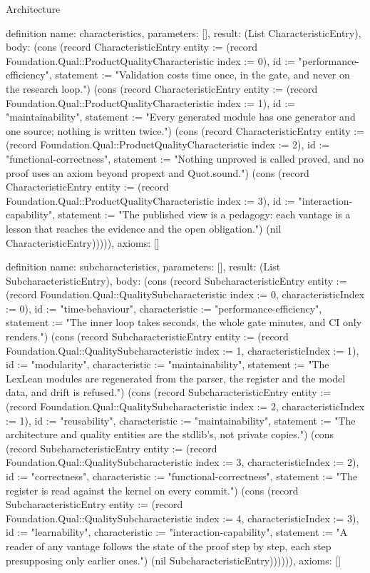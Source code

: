 \begin{lexlean}{Architecture}
\begin{semanticmodule}
definition{
  name: characteristics,
  parameters: [],
  result: (List CharacteristicEntry),
  body: (cons (record CharacteristicEntry {entity := (record Foundation.Qual::ProductQualityCharacteristic {index := 0}), id := "performance-efficiency", statement := "Validation costs time once, in the gate, and never on the research loop."}) (cons (record CharacteristicEntry {entity := (record Foundation.Qual::ProductQualityCharacteristic {index := 1}), id := "maintainability", statement := "Every generated module has one generator and one source; nothing is written twice."}) (cons (record CharacteristicEntry {entity := (record Foundation.Qual::ProductQualityCharacteristic {index := 2}), id := "functional-correctness", statement := "Nothing unproved is called proved, and no proof uses an axiom beyond propext and Quot.sound."}) (cons (record CharacteristicEntry {entity := (record Foundation.Qual::ProductQualityCharacteristic {index := 3}), id := "interaction-capability", statement := "The published view is a pedagogy: each vantage is a lesson that reaches the evidence and the open obligation."}) (nil CharacteristicEntry))))),
  axioms: []
}

definition{
  name: subcharacteristics,
  parameters: [],
  result: (List SubcharacteristicEntry),
  body: (cons (record SubcharacteristicEntry {entity := (record Foundation.Qual::QualitySubcharacteristic {index := 0, characteristicIndex := 0}), id := "time-behaviour", characteristic := "performance-efficiency", statement := "The inner loop takes seconds, the whole gate minutes, and CI only renders."}) (cons (record SubcharacteristicEntry {entity := (record Foundation.Qual::QualitySubcharacteristic {index := 1, characteristicIndex := 1}), id := "modularity", characteristic := "maintainability", statement := "The LexLean modules are regenerated from the parser, the register and the model data, and drift is refused."}) (cons (record SubcharacteristicEntry {entity := (record Foundation.Qual::QualitySubcharacteristic {index := 2, characteristicIndex := 1}), id := "reusability", characteristic := "maintainability", statement := "The architecture and quality entities are the stdlib's, not private copies."}) (cons (record SubcharacteristicEntry {entity := (record Foundation.Qual::QualitySubcharacteristic {index := 3, characteristicIndex := 2}), id := "correctness", characteristic := "functional-correctness", statement := "The register is read against the kernel on every commit."}) (cons (record SubcharacteristicEntry {entity := (record Foundation.Qual::QualitySubcharacteristic {index := 4, characteristicIndex := 3}), id := "learnability", characteristic := "interaction-capability", statement := "A reader of any vantage follows the state of the proof step by step, each step presupposing only earlier ones."}) (nil SubcharacteristicEntry)))))),
  axioms: []
}


\end{semanticmodule}
\end{lexlean}
